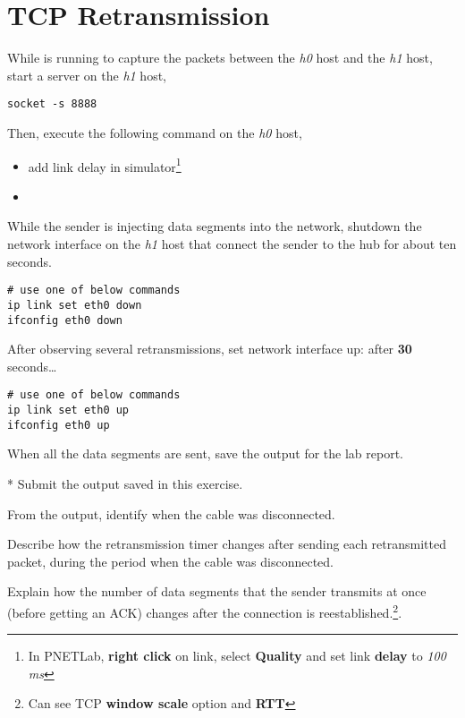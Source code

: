 \documentclass{../UTNetLab}
\begin{document}
\section{TCP Retransmission}
While  is running to capture the packets between the \textit{h0} host and the \textit{h1} host, start a  server on the \textit{h1} host,
\begin{lstlisting}
socket -s 8888
    \end{lstlisting}
Then, execute the following command on the \textit{h0} host,
\begin{itemize} 
    \item add link delay in simulator\footnote{In PNETLab, \textbf{right click} on link, select \textbf{Quality} and set link \textbf{delay} to \textit{100 ms}}
    \item {}
\end{itemize}
While the sender is injecting data segments into the network, shutdown the network interface on the \textit{h1} host that connect the sender to the hub for about ten seconds.
\begin{lstlisting}[emph={eth0},morekeywords={[3]link,set,down}]
# use one of below commands
ip link set eth0 down
ifconfig eth0 down
    \end{lstlisting}

After observing several retransmissions, set network interface up:
after \textbf{30} seconds\ldots
\begin{lstlisting}[emph={eth0},morekeywords={[3]link,set,up}]
# use one of below commands
ip link set eth0 up
ifconfig eth0 up
    \end{lstlisting} %
When all the data segments are sent, save the  output for the lab report.

\begin{report}
    \item [*] Submit the  output saved in this exercise.

    \item From the  output, identify when the cable was disconnected.

    \item Describe how the retransmission timer changes after sending each retransmitted packet, during the period when the cable was disconnected.

    \item Explain how the number of data segments that the sender transmits at once (before getting an ACK) changes after the connection is reestablished.\footnote{Can see TCP \textbf{window scale} option and \textbf{RTT}}.
\end{report}
\end{document}
